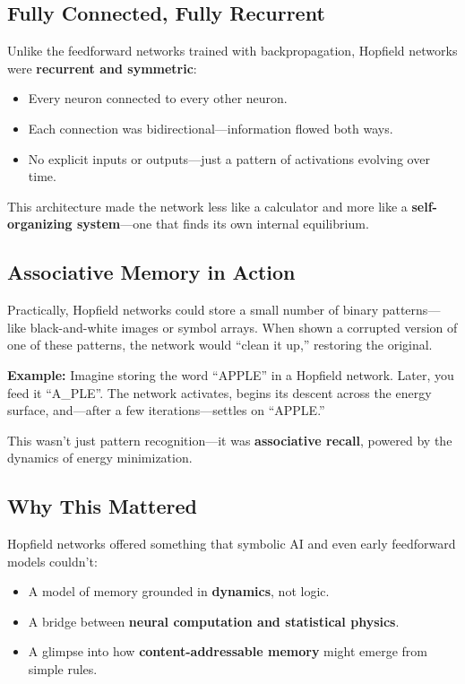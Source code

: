 \subsection{Fully Connected, Fully Recurrent}

Unlike the feedforward networks trained with backpropagation, Hopfield networks were \textbf{recurrent and symmetric}:
\begin{itemize}
  \item Every neuron connected to every other neuron.
  \item Each connection was bidirectional—information flowed both ways.
  \item No explicit inputs or outputs—just a pattern of activations evolving over time.
\end{itemize}

This architecture made the network less like a calculator and more like a \textbf{self-organizing system}—one that finds its own internal equilibrium.

\subsection{Associative Memory in Action}

Practically, Hopfield networks could store a small number of binary patterns—like black-and-white images or symbol arrays. When shown a corrupted version of one of these patterns, the network would “clean it up,” restoring the original.

\textbf{Example:} Imagine storing the word “APPLE” in a Hopfield network. Later, you feed it “A\_PLE”. The network activates, begins its descent across the energy surface, and—after a few iterations—settles on “APPLE.”

This wasn’t just pattern recognition—it was \textbf{associative recall}, powered by the dynamics of energy minimization.

\subsection{Why This Mattered}

Hopfield networks offered something that symbolic AI and even early feedforward models couldn’t:
\begin{itemize}
  \item A model of memory grounded in \textbf{dynamics}, not logic.
  \item A bridge between \textbf{neural computation and statistical physics}.
  \item A glimpse into how \textbf{content-addressable memory} might emerge from simple rules.
\end{itemize}

